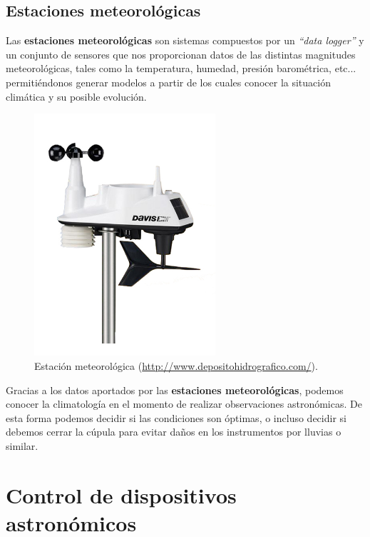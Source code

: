 \subsection{Estaciones meteorológicas}

Las \textbf{estaciones meteorológicas} son sistemas compuestos por un \textit{``data logger''} y un conjunto de sensores que nos proporcionan datos de las distintas magnitudes meteorológicas, tales como la temperatura, humedad, presión barométrica, etc... permitiéndonos generar modelos a partir de los cuales conocer la situación climática y su posible evolución. 

\bigskip
\begin{figure}[!ht]
  \begin{center}
  \includegraphics[width=0.6\textwidth]{../images/estacion.jpg}
  \caption{Estación meteorológica (\href{http://www.depositohidrografico.com/}{http://www.depositohidrografico.com/}).}
  \label{fig:diag_scrum}
  \end{center}
\end{figure}


\bigskip
Gracias a los datos aportados por las \textbf{estaciones meteorológicas}, podemos conocer la climatología en el momento de realizar observaciones astronómicas. De esta forma podemos decidir si las condiciones son óptimas, o incluso decidir si debemos cerrar la cúpula para evitar daños en los instrumentos por lluvias o similar. 

\newpage
\section{Control de dispositivos astronómicos}

